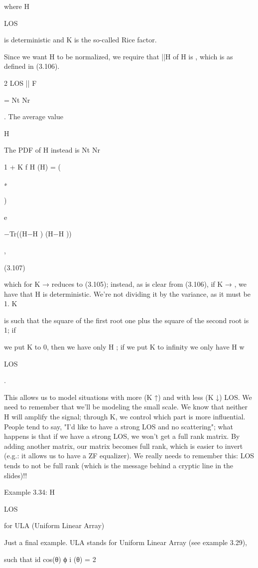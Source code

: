 {{{{where H

LOS

is deterministic and K is the so-called Rice factor.

Since we want H to be normalized, we require that ||H of H is \mu , which is as defined in (3.106).

2 LOS || F

= Nt Nr

. The average value

H

The PDF of H instead is Nt Nr

1 + K f H (H) = (

∗

)

e

−Tr((H−\mu H ) (H−\mu H ))

,

(3.107)

\pi

which for K → \infty reduces to (3.105); instead, as is clear from (3.106), if K → \infty, we have that H is deterministic.
We're not dividing it by the variance, as it must be 1.
K

is such that the square of the first root one plus the square of the second root is 1; if

we put K to 0, then we have only H ; if we put K to infinity we only have H w

LOS

.

This allows us to model situations with more (K ↑) and with less (K ↓) LOS. We need to remember that we'll be modeling the small scale.
We know that neither H will amplify the signal; through K, we control which part is more influential.
People tend to say, "I'd like to have a strong LOS and no scattering"; what happens is that if we have a strong LOS, we won't get a full rank matrix. By adding another matrix, our matrix becomes full rank, which is easier to invert (e.g.: it allows us to have a ZF equalizer).
We really needs to remember this: LOS tends to not be full rank (which is the message behind a cryptic line in the slides)!!

Example 3.34: H

LOS

for ULA (Uniform Linear Array)

Just a final example. ULA stands for Uniform Linear Array (see example 3.29),

such that id cos(θ)
ϕ i (θ) = 2\pi

}}}}
